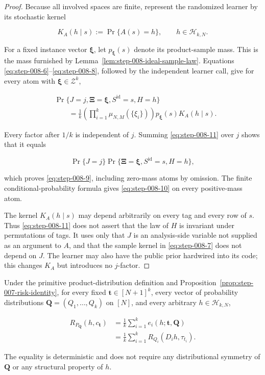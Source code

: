 \begin{proof}
Because all involved spaces are finite, represent the randomized learner by
its stochastic kernel

\[
K_A(h\mid s):=\Pr\{A(s)=h\},
\qquad h\in\mathcal H_{k,N}.
\]

For a fixed instance vector \(\boldsymbol\xi\), let
\(p_{\boldsymbol\xi}(s)\) denote its product-sample mass.  This is the
mass furnished by Lemma~\ref{lem:step-008-ideal-sample-law}. Equations
\eqref{eq:step-008-6}--\eqref{eq:step-008-8}, followed by the independent
learner call, give for every atom with
\(\boldsymbol\xi\in\mathcal Z^k\),

\[
\begin{aligned}
&\Pr\{J=j,\boldsymbol\Xi=\boldsymbol\xi,
       S^{\mathrm{id}}=s,H=h\}\\
&\qquad=\frac1k
  \left(\prod_{i=1}^k\mu_{N,M}(\{\xi_i\})\right)
  p_{\boldsymbol\xi}(s)K_A(h\mid s).
\end{aligned}
\tag{S8.11}\label{eq:step-008-11}
\]

Every factor after \(1/k\) is independent of \(j\). Summing \eqref{eq:step-008-11} over
\(j\) shows that it equals

\[
\Pr\{J=j\}\Pr\{\boldsymbol\Xi=\boldsymbol\xi,
S^{\mathrm{id}}=s,H=h\},
\]

which proves \eqref{eq:step-008-9}, including zero-mass atoms by omission. The finite
conditional-probability formula gives \eqref{eq:step-008-10} on every positive-mass atom.

The kernel \(K_A(h\mid s)\) may depend arbitrarily on every tag and every
row of \(s\). Thus \eqref{eq:step-008-11} does not assert that the law of \(H\) is invariant
under permutations of tags. It uses only that \(J\) is an analysis-side
variable not supplied as an argument to \(A\), and that the sample kernel
in \eqref{eq:step-008-7} does not depend on \(J\). The learner may also have the public prior
hardwired into its code; this changes \(K_A\) but introduces no \(j\)-factor.
\end{proof}

\begin{proposition}\label{prop:step-008-risk-decomposition}
Under the primitive product-distribution definition and Proposition~\ref{prop:step-007-risk-identity}, for every fixed
\(\boldsymbol t\in[N+1]^k\), every vector of probability distributions
\(\boldsymbol Q=(Q_1,\ldots,Q_k)\) on \([N]\), and every arbitrary
\(h\in\mathcal H_{k,N}\),

\[
\begin{aligned}
R_{P_{\boldsymbol Q}}(h,c_{\boldsymbol t})
&=\frac1k\sum_{i=1}^k e_i(h;\boldsymbol t,\boldsymbol Q)\\
&=\frac1k\sum_{i=1}^k
  R_{Q_i}(D_i h,\tau_{t_i}).
\end{aligned}
\tag{S8.12}\label{eq:step-008-12}
\]

The equality is deterministic and does not require any distributional
symmetry of \(\boldsymbol Q\) or any structural property of \(h\).
\end{proposition}

